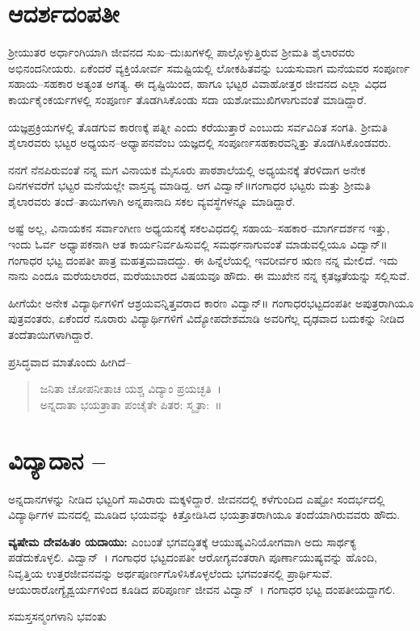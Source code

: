 {\section*{ಆದರ್ಶದಂಪತೀ}

ಶ್ರೀಯುತರ ಅರ್ಧಾಂಗಿಯಾಗಿ ಜೀವನದ ಸುಖ–ದುಃಖಗಳಲ್ಲಿ ಪಾಲ್ಗೊಳ್ಳುತ್ತಿರುವ ಶ್ರೀಮತಿ ಶೈಲಾರವರು ಅಭಿನಂದನೀಯರು. ಏಕೆಂದರೆ ವ್ಯಕ್ತಿಯೋರ್ವ ಸಮಷ್ಟಿಯಲ್ಲಿ ಲೋಕಹಿತವನ್ನು ಬಯಸುವಾಗ ಮನೆಯವರ ಸಂಪೂರ್ಣ ಸಹಾಯ–ಸಹಕಾರ ಅತ್ಯಂತ ಅಗತ್ಯ. ಈ ದೃಷ್ಟಿಯಿಂದ, ಹಾಗೂ ಭಟ್ಟರ ವಿವಾಹೋತ್ತರ ಜೀವನದ ಎಲ್ಲಾ ವಿಧದ ಕಾರ್ಯಕೈಂಕರ್ಯಗಳಲ್ಲಿ ಸಂಪೂರ್ಣ ತೊಡಗಿಸಿಕೊಂಡು ಸದಾ ಯಶೋಮುಖಿಗಳಾಗುವಂತೆ ಮಾಡಿದ್ದಾರೆ. 

ಯಜ್ಞಪ್ರಕ್ರಿಯಗಳಲ್ಲಿ ತೊಡಗುವ ಕಾರಣಕ್ಕೆ ಪತ್ನೀ ಎಂದು ಕರೆಯುತ್ತಾರೆ ಎಂಬುದು ಸರ್ವವಿದಿತ ಸಂಗತಿ. ಶ್ರೀಮತಿ ಶೈಲಾರವರು ಭಟ್ಟರ ಅಧ್ಯಯನ–ಅಧ್ಯಾಪನವೆಂಬ ಯಜ್ಞದಲ್ಲಿ ಸಂಪೂರ್ಣಸಹಕಾರವನ್ನಿತ್ತು ತೊಡಗಿಸಿಕೊಂಡವರು. 									

ನನಗೆ ನೆನಪಿರುವಂತೆ ನನ್ನ ಮಗ ವಿನಾಯಕ ಮೈಸೂರು ಪಾಠಶಾಲೆಯಲ್ಲಿ ಅಧ್ಯಯನಕ್ಕೆ ತೆರಳಿದಾಗ ಅನೇಕ ದಿನಗಳವರೆಗೆ ಭಟ್ಟರ ಮನೆಯಲ್ಲೇ ವಾಸ್ತವ್ಯ ಮಾಡಿದ್ದ. ಆಗ ವಿದ್ವಾನ್॥ಗಂಗಾಧರ ಭಟ್ಟರು ಮತ್ತು ಶ್ರೀಮತಿ ಶೈಲಾರವರು ತಂದೆ–ತಾಯಿಗಳಾಗಿ ಅನ್ನಪಾನಾದಿ ಸಕಲ ವ್ಯವಸ್ಥೆಗಳನ್ನೂ ಮಾಡಿದ್ದಾರೆ. 

ಅಷ್ಟೆ ಅಲ್ಲ, ವಿನಾಯಕನ ಸರ್ವಾಂಗೀಣ ಅಧ್ಯಯನಕ್ಕೆ ಸಕಲವಿಧದಲ್ಲಿ ಸಹಾಯ–ಸಹಕಾರ–ಮಾರ್ಗ\-ದರ್ಶನ ಇತ್ತು, ಇಂದು ಓರ್ವ ಅಧ್ಯಾಪಕನಾಗಿ ಆತ ಕಾರ್ಯನಿರ್ವಹಿಸುವಲ್ಲಿ ಸಮರ್ಥನಾಗುವಂತೆ ಮಾಡುವಲ್ಲಿಯೂ ವಿದ್ವಾನ್॥ ಗಂಗಾಧರ ಭಟ್ಟ ದಂಪತೀ ಪಾತ್ರ ಮಹತ್ತಮವಾದದ್ದು. ಈ ಹಿನ್ನೆಲೆಯಲ್ಲಿ ಇವರೀರ್ವರ ಋಣ ನನ್ನ ಮೇಲಿದೆ. ಇದು ನಾನು ಎಂದೂ ಮರೆಯಲಾರದ, ಮರೆಯಬಾರದ ವಿಷಯವೂ ಹೌದು. ಈ ಮುಖೇನ ನನ್ನ ಕೃತಜ್ಞತೆಯನ್ನು ಸಲ್ಲಿಸುವೆ. 

ಹೀಗೆಯೇ ಅನೇಕ ವಿದ್ಯಾರ್ಥಿಗಳಿಗೆ ಆಶ್ರಯವನ್ನಿತ್ತವರಾದ ಕಾರಣ ವಿದ್ವಾನ್॥ ಗಂಗಾಧರಭಟ್ಟದಂಪತೀ ಅಪುತ್ರರಾಗಿಯೂ ಪುತ್ರವಂತರು, ಏಕೆಂದರೆ ನೂರಾರು ವಿದ್ಯಾರ್ಥಿಗಳಿಗೆ ವಿದ್ಯೋಪದೇಶಮಾಡಿ ಅವರಿಗೆಲ್ಲ ದೃಢವಾದ ಬದುಕನ್ನು ನೀಡಿದ ತಂದೆತಾಯಿಗಳಾಗಿದ್ದಾರೆ. 					

ಪ್ರಸಿದ್ಧವಾದ ಮಾತೊಂದು ಹೀಗಿದೆ– 
\begin{verse}
ಜನಿತಾ ಚೋಪನೀತಾಚ ಯಶ್ಚ ವಿದ್ಯಾಂ ಪ್ರಯಚ್ಛತಿ~।\\
ಅನ್ನದಾತಾ ಭಯತ್ರಾತಾ ಪಂಚೈತೇ ಪಿತರ: ಸ್ಮೃತಾ:~॥ 		
\end{verse}

\section*{ವಿದ್ಯಾದಾನ –} 

ಅನ್ನದಾನಗಳನ್ನು ನೀಡಿದ ಭಟ್ಟರಿಗೆ ಸಾವಿರಾರು ಮಕ್ಕಳಿದ್ದಾರೆ. ಜೀವನದಲ್ಲಿ ಕಳೆಗುಂದಿದ ಎಷ್ಟೋ ಸಂದರ್ಭದಲ್ಲಿ ವಿದ್ಯಾರ್ಥಿಗಳ ಮನದಲ್ಲಿ ಮೂಡಿದ ಭಯವನ್ನು ಕಿತ್ತೋಡಿಸಿದ ಭಯತ್ರಾತರಾಗಿಯೂ ತಂದೆಯಾಗಿರುವವರು ಹೌದು.

\textbf{ವ್ಯಷೇಮ ದೇವಹಿತಂ ಯದಾಯು:} ಎಂಬಂತೆ ಭಗವದ್ಧಿತಕ್ಕೆ ಆಯುಷ್ಯವಿನಿಯೋಗವಾಗಿ ಅದು ಸಾರ್ಥಕ್ಯ ಪಡೆದುಕೊಳ್ಳಲಿ. ವಿದ್ವಾನ್~। ಗಂಗಾಧರ ಭಟ್ಟದಂಪತೀ ಆರೋಗ್ಯವಂತರಾಗಿ ಪೂರ್ಣಾಯುಷ್ಯವನ್ನು ಹೊಂದಿ, ನಿವೃತ್ತಿಯ ಉತ್ತರಜೀವನವನ್ನು ಅರ್ಥಪೂರ್ಣಗೊಳಿಸಿಕೊಳ್ಳಲೆಂದು ಭಗವಂತನಲ್ಲಿ ಪ್ರಾರ್ಥಿಸುವೆ. ಆಯುರಾರೋಗ್ಯೈಶ್ವರ್ಯಗಳಿಂದ ಕೂಡಿದ ಪರಿಪೂರ್ಣ ಜೀವನ ವಿದ್ವಾನ್~। ಗಂಗಾಧರ ಭಟ್ಟ ದಂಪತೀಯದ್ದಾಗಲಿ. 

\centerline{ಸಮಸ್ತಸನ್ಮಂಗಳಾನಿ ಭವಂತು}

\articleend
}
